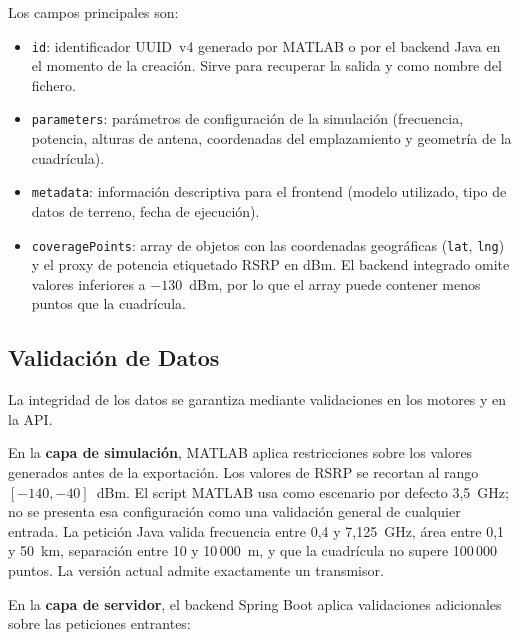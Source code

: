 Los campos principales son:

\begin{itemize}
  \item \lstinline{id}: identificador UUID~v4 generado por MATLAB o por el backend Java
    en el momento de la creación. Sirve para recuperar la salida y como nombre del fichero.
  \item \lstinline{parameters}: parámetros de configuración de la simulación (frecuencia,
    potencia, alturas de antena, coordenadas del emplazamiento y geometría de la cuadrícula).
  \item \lstinline{metadata}: información descriptiva para el frontend (modelo utilizado,
    tipo de datos de terreno, fecha de ejecución).
  \item \lstinline{coveragePoints}: array de objetos con las coordenadas geográficas
    (\lstinline{lat}, \lstinline{lng}) y el proxy de potencia etiquetado RSRP en dBm.
    El backend integrado omite valores inferiores a $-130$~dBm, por lo que el array
    puede contener menos puntos que la cuadrícula.
\end{itemize}

\subsection{Validación de Datos}
\label{subsec:validacion_datos}

La integridad de los datos se garantiza mediante validaciones en los motores y en la API.

En la \textbf{capa de simulación}, MATLAB aplica restricciones sobre los valores generados
antes de la exportación. Los valores de RSRP se recortan al rango $[-140, -40]$~dBm. El
script MATLAB usa como escenario por defecto 3,5~GHz; no se presenta esa configuración
como una validación general de cualquier entrada. La petición Java valida frecuencia entre
0,4 y 7,125~GHz, área entre 0,1 y 50~km, separación entre 10 y 10\,000~m, y que la
cuadrícula no supere 100\,000 puntos. La versión actual admite exactamente un transmisor.

En la \textbf{capa de servidor}, el backend Spring Boot aplica validaciones adicionales
sobre las peticiones entrantes:

